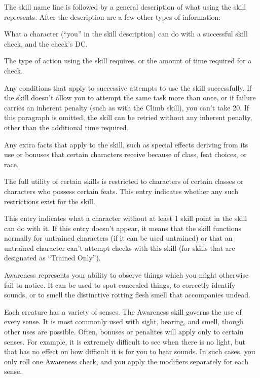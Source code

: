 \par The skill name line is followed by a general description of what using the skill represents. After the description are a few other types of information:

 What a character (``you'' in the skill description) can do with a successful skill check, and the check's DC.

 The type of action using the skill requires, or the amount of time required for a check.

 Any conditions that apply to successive attempts to use the skill successfully. If the skill doesn't allow you to attempt the same task more than once, or if failure carries an inherent penalty (such as with the Climb skill), you can't take 20. If this paragraph is omitted, the skill can be retried without any inherent penalty, other than the additional time required.

 Any extra facts that apply to the skill, such as special effects deriving from its use or bonuses that certain characters receive because of class, feat choices, or race.

 The full utility of certain skills is restricted to characters of certain classes or characters who possess certain feats. This entry indicates whether any such restrictions exist for the skill.

 This entry indicates what a character without at least 1 skill point in the skill can do with it. If this entry doesn't appear, it means that the skill functions normally for untrained characters (if it can be used untrained) or that an untrained character can't attempt checks with this skill (for skills that are designated as ``Trained Only'').

Awareness represents your ability to observe things which you might otherwise fail to notice. It can be used to spot concealed things, to correctly identify sounds, or to smell the distinctive rotting flesh smell that accompanies undead.

Each creature has a variety of senses. The Awareness skill governs the use of every sense. It is most commonly used with sight, hearing, and smell, though other uses are possible. Often, bonuses or penalites will apply only to certain senses. For example, it is extremely difficult to see when there is no light, but that has no effect on how difficult it is for you to hear sounds. In such cases, you only roll one Awareness check, and you apply the modifiers separately for each sense.


